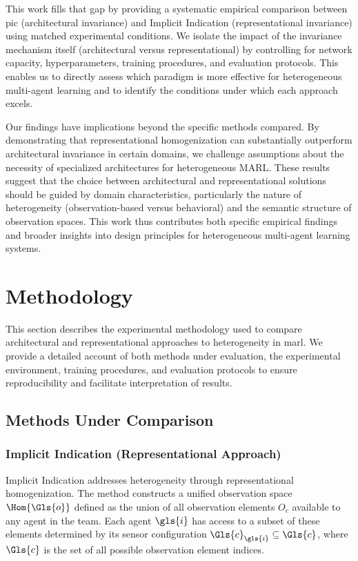 This work fills that gap by providing a systematic empirical comparison between 
\gls{pic} (architectural invariance) and Implicit Indication (representational invariance) 
using matched experimental conditions. 
We isolate the impact of the invariance mechanism itself (architectural versus 
representational) by controlling for network capacity, hyperparameters, training procedures, 
and evaluation protocols. 
This enables us to directly assess which paradigm is more effective for 
heterogeneous multi-agent learning and to identify the conditions under which each approach excels.

Our findings have implications beyond the specific methods compared. 
By demonstrating that representational homogenization can substantially 
outperform architectural invariance in certain domains, we challenge 
assumptions about the necessity of specialized architectures for heterogeneous MARL. 
These results suggest that the choice between architectural and representational 
solutions should be guided by domain characteristics, particularly the nature of 
heterogeneity (observation-based versus behavioral) 
and the semantic structure of observation spaces. 
This work thus contributes both specific empirical findings and broader insights 
into design principles for heterogeneous multi-agent learning systems.

\section{Methodology}

This section describes the experimental methodology used to compare architectural and 
representational approaches to heterogeneity in \gls{marl}.
We provide a detailed account of both methods under evaluation, the experimental environment, 
training procedures, and evaluation protocols to ensure reproducibility and facilitate 
interpretation of results.

\subsection{Methods Under Comparison}

\subsubsection{Implicit Indication (Representational Approach)}

Implicit Indication addresses heterogeneity through representational homogenization.
The method constructs a unified observation space \(\Hom{\Gls{o}}\)
defined as the union of all observation elements $O_c$ available to any agent in the team. 
Each agent \(\gls{i}\) has access to a subset of these elements determined by its sensor 
configuration \(\Gls{c}_{\gls{i}} \subseteq \Gls{c}\), 
where \(\Gls{c}\) is the set of all possible observation element indices.

